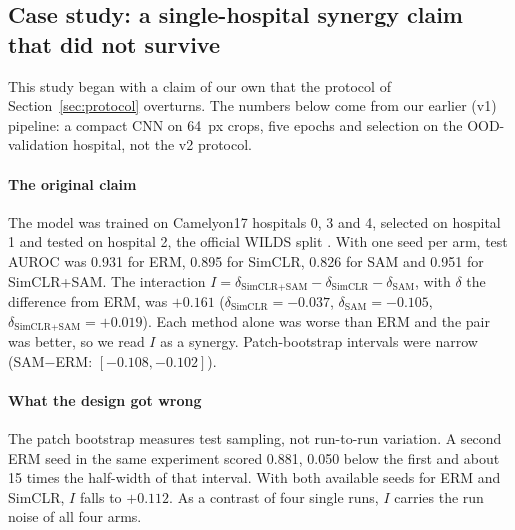 
\subsection{Case study: a single-hospital synergy claim that did not survive}
\label{sec:casestudy}

This study began with a claim of our own that the protocol of
Section~\ref{sec:protocol} overturns. The numbers below come from our earlier
(v1) pipeline: a compact CNN on 64~px crops, five epochs and selection on the
OOD-validation hospital, not the v2 protocol.

\paragraph{The original claim} The model was trained on Camelyon17 hospitals 0,
3 and 4, selected on hospital 1 and tested on hospital 2, the official WILDS
split \citep{koh2021wilds}. With one seed per arm, test AUROC was 0.931 for
ERM, 0.895 for SimCLR, 0.826 for SAM and 0.951 for SimCLR+SAM. The interaction
$I=\delta_{\text{SimCLR+SAM}}-\delta_{\text{SimCLR}}-\delta_{\text{SAM}}$, with
$\delta$ the difference from ERM, was $+0.161$ ($\delta_{\text{SimCLR}}=-0.037$,
$\delta_{\text{SAM}}=-0.105$, $\delta_{\text{SimCLR+SAM}}=+0.019$). Each method
alone was worse than ERM and the pair was better, so we read $I$ as a synergy.
Patch-bootstrap intervals were narrow (SAM$-$ERM:
$[-0.108,-0.102]$).

\paragraph{What the design got wrong} The patch bootstrap measures test
sampling, not run-to-run variation. A second ERM seed in the same experiment
scored 0.881, 0.050 below the first and about 15 times the half-width of that
interval. With both available seeds for ERM and SimCLR, $I$ falls to $+0.112$.
As a contrast of four single runs, $I$ carries the run noise of all four arms.

